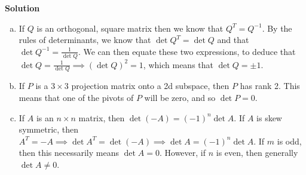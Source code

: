 \documentclass[11pt]{article}
\begin{document}
\noindent \textbf{Solution}\\
\begin{enumerate}[(a)]
\item If $Q$ is an orthogonal, square matrix then we know that $Q^T = Q^{-1}$. By the rules of determinants, we know that $\det Q^T = \det Q$ and that $\det Q^{-1} = \frac{1}{\det Q} $. We can then equate these two expressions, to deduce that $\det Q = \frac{1}{\det Q} \implies \left(\det Q \right)^2 = 1$, which means that $\det Q = \pm 1$.
\item If $P$ is a $3\times 3$ projection matrix onto a 2d subspace, then $P$ has rank 2. This means that one of the pivots of $P$ will be zero, and so $\det P = 0$. 
\item If $A$ is an $n\times n$ matrix, then $\det (-A) = (-1)^n\det A$. If $A$ is skew symmetric, then $A^T = -A \implies \det A^T = \det (-A) \implies \det A = (-1)^n \det A$. If $m$ is odd, then this necessarily means $\det A = 0$. However, if $n$ is even, then generally $\det A \neq 0$. 
\end{enumerate}

\
\end{document}

